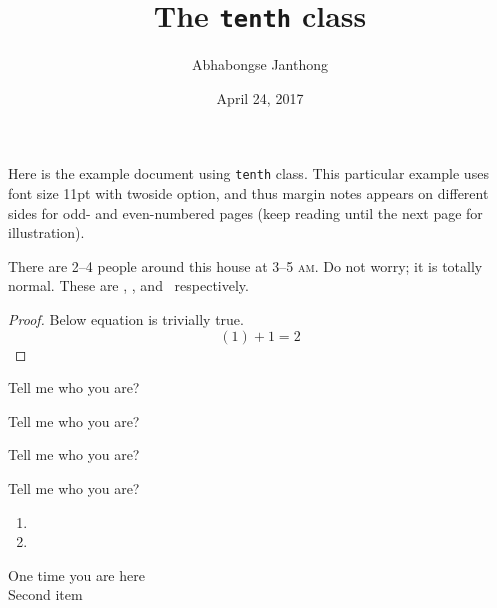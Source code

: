 \documentclass[11pt,twoside]{tenth}
\title{The \texttt{tenth} class}
\author{Abhabongse Janthong}
\date{April 24, 2017}
\begin{document}
    \maketitle

    Here is the example document using \texttt{tenth} class. This particular example uses font size 11pt with twoside option, and thus margin notes  appears on different sides for odd- and even-numbered pages (keep reading until the next page for illustration).

    \lipsum[1-5]

    There are 2--4 people around this house at 3--5 \textsc{am}.  Do not worry; it is totally normal. These are \redsq, \greensq, and \bluesq\ respectively.

    \begin{proof}
        Below equation is trivially true.
        \begin{equation}
            (1) + 1 = 2
        \end{equation}
    \end{proof}

    \begin{question}
        Tell me who you are?
    \end{question}
    \begin{definition}
        Tell me who you are?
    \end{definition}
    \begin{theorem}
        Tell me who you are?
    \end{theorem}
    \begin{remark}
        Tell me who you are?
    \end{remark}

    \begin{enumerate}
        \item \lipsum[1-3]
        \item \lipsum[2-4]
    \end{enumerate}

    \begin{description}
        \item[One time you are here] \lipsum[1-2]
        \item[Second item] \lipsum[3-4]
    \end{description}
\end{document}
